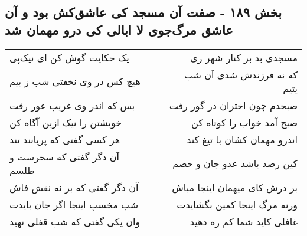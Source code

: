 \begin{center}
\section*{بخش ۱۸۹ - صفت آن مسجد کی عاشق‌کش بود و آن عاشق مرگ‌جوی لا ابالی کی درو مهمان شد}
\label{sec:sh189}
\begin{longtable}{l p{0.5cm} r}
یک حکایت گوش کن ای نیک‌پی
&&
مسجدی بد بر کنار شهر ری
\\
هیچ کس در وی نخفتی شب ز بیم
&&
که نه فرزندش شدی آن شب یتیم
\\
بس که اندر وی غریب عور رفت
&&
صبحدم چون اختران در گور رفت
\\
خویشتن را نیک ازین آگاه کن
&&
صبح آمد خواب را کوتاه کن
\\
هر کسی گفتی که پریانند تند
&&
اندرو مهمان کشان با تیغ کند
\\
آن دگر گفتی که سحرست و طلسم
&&
کین رصد باشد عدو جان و خصم
\\
آن دگر گفتی که بر نه نقش فاش
&&
بر درش کای میهمان اینجا مباش
\\
شب مخسپ اینجا اگر جان بایدت
&&
ورنه مرگ اینجا کمین بگشایدت
\\
وان یکی گفتی که شب قفلی نهید
&&
غافلی کاید شما کم ره دهید
\\
\end{longtable}
\end{center}
